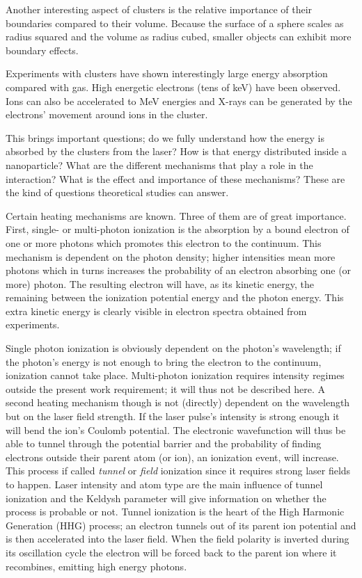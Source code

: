 Another interesting aspect of clusters is the relative importance of
their boundaries compared to their volume. Because the surface of a sphere
scales as radius squared and the volume as radius cubed, smaller objects can
exhibit more boundary effects.

Experiments with clusters have shown interestingly large energy absorption
compared with gas\cite{Wabnitz2002,Bostedt2010}. High energetic electrons (tens
of keV) have been observed.
Ions can also be accelerated to MeV energies and X-rays can be generated by the
electrons' movement around ions in the cluster\cite{Ramunno2008}.

This brings important questions; do we fully understand how the energy is
absorbed by the clusters from the laser? How is that energy distributed
inside a nanoparticle? What are the different mechanisms that play a role in
the interaction? What is the effect and importance of these mechanisms? These
are the kind of questions theoretical studies can answer.

Certain heating mechanisms are known. Three of them are of great importance.
First, single- or multi-photon ionization is the absorption by a bound electron
of one or more photons which promotes this electron to the continuum. This
mechanism is dependent on the photon density; higher intensities mean more
photons which in turns increases the probability of an electron absorbing one
(or more) photon. The resulting electron will have, as its kinetic energy, the
remaining between the ionization potential energy and the photon energy. This
extra kinetic energy is clearly visible in electron spectra obtained from
experiments\citeneeded.

Single photon ionization is obviously dependent on the photon's wavelength; if
the photon's energy is not enough to bring the electron to the continuum,
ionization cannot take place. Multi-photon ionization requires intensity
regimes outside the present work requirement; it will thus not be described
here. A second heating  mechanism though is not
(directly) dependent on the wavelength but on the laser field strength. If the
laser pulse's intensity is strong enough it will bend the ion's Coulomb
potential. The electronic wavefunction will thus be able to tunnel
through the potential barrier and the probability of finding electrons
outside their parent atom (or ion), an ionization event, will increase. This
process if called \textit{tunnel} or \textit{field} ionization  since it
requires strong laser fields to happen. Laser intensity and atom type are the
main influence of tunnel ionization and the Keldysh parameter will give
information on whether the process is probable or not. Tunnel ionization is the
heart of the High Harmonic Generation (HHG) process; an electron tunnels out of
its parent ion potential and is then accelerated into the laser
field. When the field polarity is inverted during its oscillation cycle the
electron will be forced back to the parent ion where it recombines, emitting
high energy photons\citeneeded.

